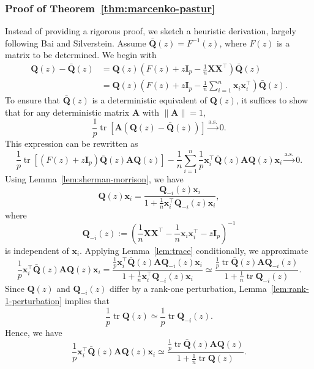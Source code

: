 \documentclass[12pt]{article}
\DeclareMathOperator{\tr}{tr}
\begin{document}
\subsubsection*{Proof of Theorem~\ref{thm:marcenko-pastur}}
Instead of providing a rigorous proof, we sketch a heuristic derivation, largely following Bai and Silverstein. Assume $\bar{\mathbf{Q}}(z) = F^{-1}(z)$, where $F(z)$ is a matrix to be determined. We begin with
\begin{align*}
\mathbf{Q}(z) - \bar{\mathbf{Q}}(z)
&= \mathbf{Q}(z) \left( F(z) + z \mathbf{I}_p - \frac{1}{n} \mathbf{X} \mathbf{X}^\top \right) \bar{\mathbf{Q}}(z) \\
&= \mathbf{Q}(z) \left( F(z) + z \mathbf{I}_p - \frac{1}{n} \sum_{i=1}^n \mathbf{x}_i \mathbf{x}_i^\top \right) \bar{\mathbf{Q}}(z).
\end{align*}
To ensure that $\bar{\mathbf{Q}}(z)$ is a deterministic equivalent of $\mathbf{Q}(z)$, it suffices to show that for any deterministic matrix $\mathbf{A}$ with $\|\mathbf{A}\| = 1$,
$$
\frac{1}{p} \tr \left[ \mathbf{A} \left( \mathbf{Q}(z) - \bar{\mathbf{Q}}(z) \right) \right] \xrightarrow{\text{a.s.}} 0.
$$
This expression can be rewritten as
$$
\frac{1}{p} \tr \left[ (F(z) + z \mathbf{I}_p) \bar{\mathbf{Q}}(z) \mathbf{A} \mathbf{Q}(z) \right]
- \frac{1}{n} \sum_{i=1}^n \frac{1}{p} \mathbf{x}_i^\top \bar{\mathbf{Q}}(z) \mathbf{A} \mathbf{Q}(z) \mathbf{x}_i \xrightarrow{\text{a.s.}} 0.
$$
Using Lemma~\ref{lem:sherman-morrison}, we have
$$
\mathbf{Q}(z) \mathbf{x}_i = \frac{\mathbf{Q}_{-i}(z) \mathbf{x}_i}{1 + \frac{1}{n} \mathbf{x}_i^\top \mathbf{Q}_{-i}(z) \mathbf{x}_i},
$$
where
$$
\mathbf{Q}_{-i}(z) := \left( \frac{1}{n} \mathbf{X}\mathbf{X}^\top - \frac{1}{n} \mathbf{x}_i \mathbf{x}_i^\top - z \mathbf{I}_p \right)^{-1}
$$
is independent of $\mathbf{x}_i$. Applying Lemma~\ref{lem:trace} conditionally, we approximate
$$
\frac{1}{p} \mathbf{x}_i^\top \bar{\mathbf{Q}}(z) \mathbf{A} \mathbf{Q}(z) \mathbf{x}_i = \frac{\frac{1}{p} \mathbf{x}_i^\top \bar{\mathbf{Q}}(z) \mathbf{A} \mathbf{Q}_{-i}(z) \mathbf{x}_i}{1 + \frac{1}{n} \mathbf{x}_i^\top \mathbf{Q}_{-i}(z) \mathbf{x}_i}\simeq \frac{\frac{1}{p} \tr\bar{\mathbf{Q}}(z) \mathbf{A} \mathbf{Q}_{-i}(z)}{1 + \frac{1}{n} \tr \mathbf{Q}_{-i}(z)}.
$$
Since $\mathbf{Q}(z)$ and $\mathbf{Q}_{-i}(z)$ differ by a rank-one perturbation, Lemma~\ref{lem:rank-1-perturbation} implies that
$$
\frac{1}{p} \tr \mathbf{Q}(z) \simeq \frac{1}{p} \tr \mathbf{Q}_{-i}(z).
$$
Hence, we have
$$
\frac{1}{p} \mathbf{x}_i^\top \bar{\mathbf{Q}}(z) \mathbf{A} \mathbf{Q}(z) \mathbf{x}_i \simeq \frac{\frac{1}{p} \tr \bar{\mathbf{Q}}(z) \mathbf{A} \mathbf{Q}(z)}{1 + \frac{1}{n} \tr \mathbf{Q}(z)}.
$$
\end{document}
